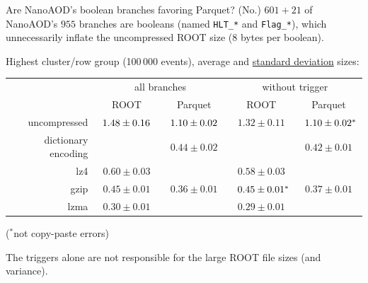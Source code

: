 \documentclass[aspectratio=169]{beamer}
\begin{document}
\begin{frame}{Are NanoAOD's boolean branches favoring Parquet? (No.)}
\vspace{0.35 cm}
$601+21$ of NanoAOD's $955$ branches are booleans (named {\tt\small HLT\_*} and {\tt\small Flag\_*}), which unnecessarily inflate the uncompressed ROOT size (8 bytes per boolean).

\vspace{0.25 cm}
Highest cluster/row group (100\,000 events), average and \underline{standard deviation} sizes:

\renewcommand{\arraystretch}{1.2}

\begin{center}
\begin{tabular}{r c c | c c}
                    & \multicolumn{2}{c}{all branches} & \multicolumn{2}{c}{without trigger} \\
                    & ROOT            & Parquet         & ROOT            & Parquet          \\\hline
uncompressed        & $^{\textcolor{white}{*}}1.48 \pm 0.16^{\textcolor{white}{*}}$ & $^{\textcolor{white}{*}}1.10 \pm 0.02^{\textcolor{white}{*}}$ & $1.32 \pm 0.11$ & $^{\textcolor{white}{*}}1.10 \pm 0.02^*$  \\
dictionary encoding &                 & $0.44 \pm 0.02$ &                 & $0.42 \pm 0.01$  \\
lz4                 & $0.60 \pm 0.03$ &                 & $0.58 \pm 0.03$ &                  \\
gzip                & $0.45 \pm 0.01$ & $0.36 \pm 0.01$ & $^{\textcolor{white}{*}}0.45 \pm 0.01^*$ & $0.37 \pm 0.01$  \\
lzma                & $0.30 \pm 0.01$ &                 & $0.29 \pm 0.01$ &                  \\
\end{tabular}
\end{center}

\vspace{-0.1 cm}
\hfill {\scriptsize ($^*$not copy-paste errors)}

\vspace{0.2 cm}
The triggers alone are not responsible for the large ROOT file sizes (and variance).
\end{frame}
\end{document}
